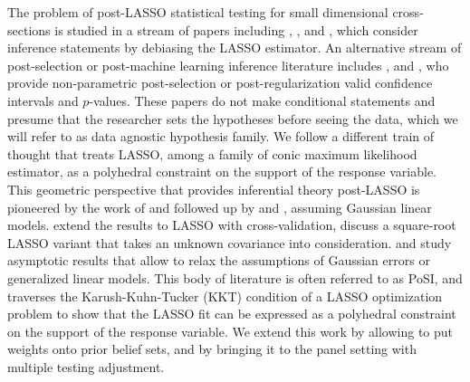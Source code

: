 \documentclass[11pt]{article}
\begin{document}
	The problem of post-LASSO statistical testing for small dimensional cross-sections is studied in a stream of papers including \cite{009053606000000281}, \cite{rssb.12026}, \cite{14-AOS1221} and \cite{10.1214/17-AOS1630}, which consider inference statements by debiasing the LASSO estimator. An alternative stream of post-selection or post-machine learning inference literature includes \cite{annurev-economics-012315-015826}, \cite{kuchibhotla2018valid} and \cite{zrnic2020postselection}, who provide non-parametric post-selection or post-regularization valid confidence intervals and $p$-values. These papers do not make conditional statements and presume that the researcher sets the hypotheses before seeing the data, which we will refer to as data agnostic hypothesis family. We follow a different train of thought that treats LASSO, among a family of conic maximum likelihood estimator, as a polyhedral constraint on the support of the response variable. This geometric perspective that provides inferential theory post-LASSO is pioneered by the work of \cite{lee2016exact} and followed up by \cite{fithian2017optimal} and \cite{tian2018selective}, assuming Gaussian linear models. \cite{markovic2018unifying} extend the results to LASSO with cross-validation, \cite{tian2017selective} discuss a square-root LASSO variant that takes an unknown covariance into consideration. \cite{taylortibshirani2016inference} and \cite{tian2017asymptotics} study asymptotic results that allow to relax the assumptions of Gaussian errors or generalized linear models. This body of literature is often referred to as PoSI, and traverses the Karush-Kuhn-Tucker (KKT) condition of a LASSO optimization problem to show that the LASSO fit can be expressed as a polyhedral constraint on the support of the response variable. We extend this work by allowing to put weights onto prior belief sets, and by bringing it to the panel setting with multiple testing adjustment. 
	
	
	
	
	
\end{document}
